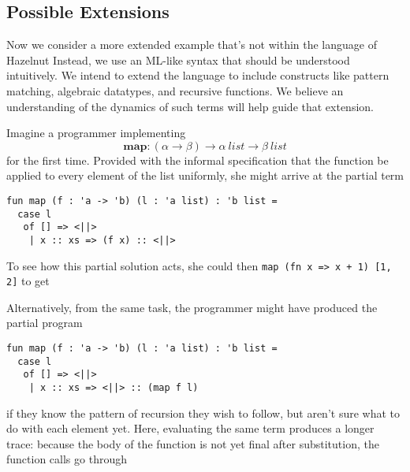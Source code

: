 \subsection{Possible Extensions}
Now we consider a more extended example that's not within the language of
Hazelnut Instead, we use an ML-like syntax that should be understood
intuitively. We intend to extend the language to include constructs like
pattern matching, algebraic datatypes, and recursive functions. We believe
an understanding of the dynamics of such terms will help guide that
extension.

Imagine a programmer implementing $$\mathbf{map} : (\alpha \to \beta) \to
\alpha ~\mathit{list} \to \beta ~\mathit{list}$$ for the first time.
Provided with the informal specification that the function be applied to
every element of the list uniformly, she might arrive at the partial term
\begin{verbatim}
fun map (f : 'a -> 'b) (l : 'a list) : 'b list =
  case l
   of [] => <||>
    | x :: xs => (f x) :: <||>
\end{verbatim}
To see how this partial solution acts, she could then
\verb|map (fn x => x + 1) [1, 2]| to get

Alternatively, from the same task, the programmer might have produced the
partial program
\begin{verbatim}
fun map (f : 'a -> 'b) (l : 'a list) : 'b list =
  case l
   of [] => <||>
    | x :: xs => <||> :: (map f l)
\end{verbatim}
if they know the pattern of recursion they wish to follow, but aren't sure
what to do with each element yet. Here, evaluating the same term produces a
longer trace: because the body of the function is not yet final after
substitution, the function calls go through
